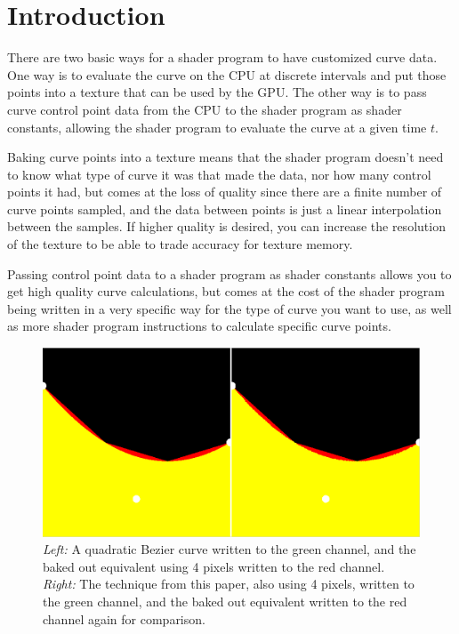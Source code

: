 \documentclass{jcgt}
\begin{document}
\section{Introduction}
\label{sec:introduction}
There are two basic ways for a shader program to have customized curve data.  One way is to evaluate the curve on the CPU at discrete intervals and put those points into a texture that can be used by the GPU.  The other way is to pass curve control point data from the CPU to the shader program as shader constants, allowing the shader program to evaluate the curve at a given time $t$.

Baking curve points into a texture means that the shader program doesn't need to know what type of curve it was that made the data, nor how many control points it had, but comes at the loss of quality since there are a finite number of curve points sampled, and the data between points is just a linear interpolation between the samples.  If higher quality is desired, you can increase the resolution of the texture to be able to trade accuracy for texture memory.

Passing control point data to a shader program as shader constants allows you to get high quality curve calculations, but comes at the cost of the shader program being written in a very specific way for the type of curve you want to use, as well as more shader program instructions to calculate specific curve points.

\begin{figure}
  \includegraphics[width=5in]{Figure2.png}
  \caption{\textit{Left:} A quadratic Bezier curve written to the green channel, and the baked out equivalent using 4 pixels written to the red channel.  \textit{Right:} The technique from this paper, also using 4 pixels, written to the green channel, and the baked out equivalent written to the red channel again for comparison.}
  \label{fig:quickcomparison}
\end{figure}
\end{document}
